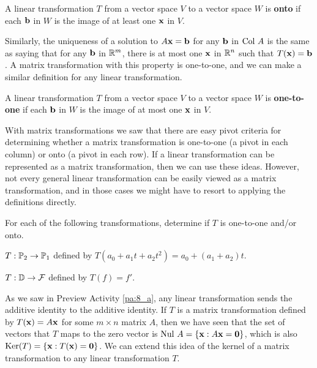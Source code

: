 \begin{definition} A linear transformation $T$ from a vector space $V$ to a vector space $W$ is \textbf{onto} if each $\mathbf{b}$ in $W$ is the image of at least one $\mathbf{x}$ in $V$.
\end{definition}

Similarly, the uniqueness of a solution to $A \mathbf{x} = \mathbf{b}$ for any $\mathbf{b}$ in $\text{Col } A$ is the same as saying that for any $\mathbf{b}$ in $\mathbb{R}^m$, there is at most one $\mathbf{x}$ in $\mathbb{R}^n$ such that $T(\mathbf{x}) = \mathbf{b}$. A matrix transformation with this property is one-to-one, and we can make a similar definition for any linear transformation. 

\begin{definition} A linear transformation $T$ from a vector space $V$ to a vector space $W$ is \textbf{one-to-one} if each $\mathbf{b}$ in $W$ is the image of at most one $\mathbf{x}$ in $V$.
\end{definition}

With matrix transformations we saw that there are easy pivot criteria for determining whether a matrix transformation is one-to-one (a pivot in each column) or onto (a pivot in each row). If a linear transformation can be represented as a matrix transformation, then we can use these ideas. However, not every general linear transformation can be easily viewed as a matrix transformation, and in those cases we might have to resort to applying the definitions directly.

\begin{activity}
For each of the following transformations, determine if $T$ is one-to-one and/or onto.
	\ba
	\item $T: \mathbb{P}_2 \to \mathbb{P}_1$ defined by $T(a_0+a_1t+a_2t^2) = a_0+(a_1+a_2)t$.
	\item $T: \mathbb{D} \to \mathcal{F}$ defined by $T(f) = f'$.
	\ea
\end{activity}




As we saw in Preview Activity \ref{pa:8_a}, any linear transformation sends the additive identity to the additive identity. If $T$ is a matrix transformation defined by $T(\mathbf{x}) = A \mathbf{x}$ for some $m \times n$ matrix $A$, then we have seen that the set of vectors that $T$ maps to the zero vector is $\text{Nul } A = \{\mathbf{x} : A \mathbf{x} = \mathbf{0}\}$, which is also $\text{Ker}(T) = \{\mathbf{x} : T(\mathbf{x}) = \mathbf{0}\}$. We can extend this idea of the kernel of a matrix transformation to any linear transformation $T$. 

